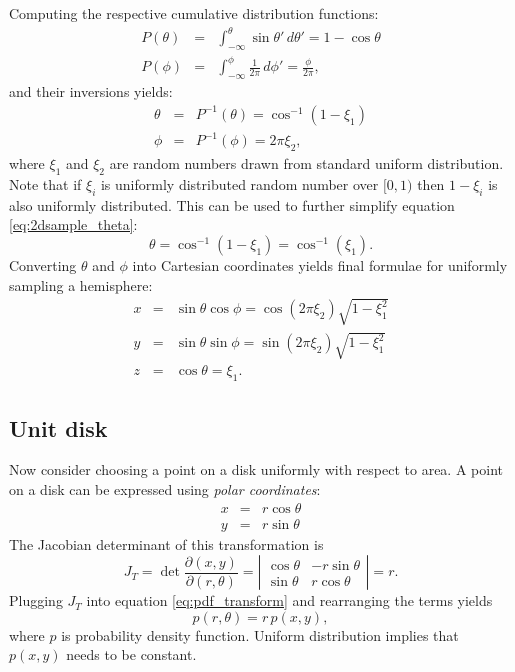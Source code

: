Computing the respective cumulative distribution functions:
\begin{eqnarray}
  P(\theta) &=& \int_{-\infty}^{\theta} \sin\theta' \,d\theta' = 1 - \cos\theta \\
  P(\phi) &=& \int_{-\infty}^{\phi} \frac{1}{2\pi} \,d\phi' = \frac{\phi}{2\pi},
\end{eqnarray}
and their inversions yields:
\begin{eqnarray}
  \theta &=& P^{-1}(\theta) = \cos^{-1}(1 - \xi_{1}) \label{eq:2dsample_theta} \\
  \phi &=& P^{-1}(\phi) = 2\pi \xi_{2},
\end{eqnarray}
where $\xi_{1}$ and $\xi_{2}$ are random numbers drawn from standard uniform distribution. Note that if $\xi_{i}$ is uniformly distributed random number over $[0,1)$ then $1-\xi_{i}$ is also uniformly distributed. This can be used to further simplify equation \ref{eq:2dsample_theta}:
\begin{equation}
  \theta = \cos^{-1}(1-\xi_{1}) = \cos^{-1}(\xi_{1}).
\end{equation}
Converting $\theta$ and $\phi$ into Cartesian coordinates yields final formulae for uniformly sampling a hemisphere:
\begin{eqnarray}
  x &=& \sin\theta \cos\phi = \cos(2\pi \xi_{2}) \sqrt{1 - \xi_{1}^{2}} \nonumber \\
  y &=& \sin\theta \sin\phi = \sin(2\pi \xi_{2}) \sqrt{1 - \xi_{1}^{2}} \\
  z &=& \cos\theta = \xi_{1}. \nonumber
\end{eqnarray}

\subsection{Unit disk}
Now consider choosing a point on a disk uniformly with respect to area. A point on a disk can be expressed using \emph{polar coordinates}:
\begin{eqnarray}
\label{eq:polar}
  x &=& r \cos\theta \nonumber \\
  y &=& r \sin\theta
\end{eqnarray}
The Jacobian determinant of this transformation is
\begin{equation}
  J_{T} = \det \frac{\partial(x,y)}{\partial(r,\theta)} =
  \left| 
    \begin{array}{cc}
      \cos\theta & -r \sin\theta \\
      \sin\theta & r \cos\theta
    \end{array}
  \right| = r.
\end{equation}
Plugging $J_{T}$ into equation \ref{eq:pdf_transform} and rearranging the terms yields
\begin{equation}
\label{eq:pdf_disk}
  p(r, \theta) = r\,p(x, y),
\end{equation}
where $p$ is probability density function. Uniform distribution implies that $p(x,y)$ needs to be constant.

